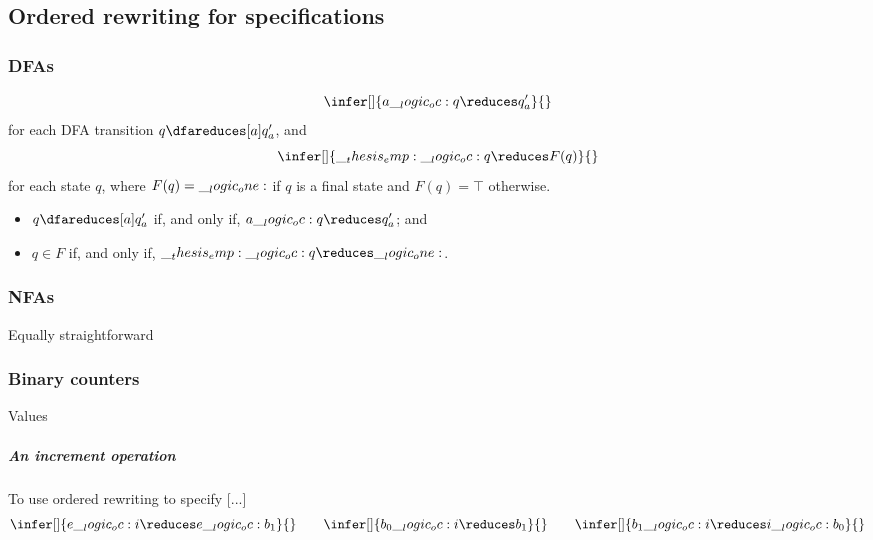 \chapter{}

\section{Ordered rewriting for specifications}

\subsection{\Aclp*{DFA}}

\begin{equation*}
  \infer[]{a \oc q \reduces q'_a}{}
\end{equation*}
for each \ac{DFA} transition $q \dfareduces[a] q'_a$, and 
\begin{equation*}
  \infer[]{\emp \oc q \reduces F(q)}{}
\end{equation*}
for each state $q$, where $F(q) = \__logic_one:$ if $q$ is a final state and $F(q) = \top$ otherwise.

\begin{itemize}
\item $q \dfareduces[a] q'_a$ if, and only if, $a \oc q \reduces q'_a$; and 
\item $q \in F$ if, and only if, $\emp \oc q \reduces \one$.
\end{itemize}

\subsection{\Aclp*{NFA}}

Equally straightforward

\subsection{Binary counters}

Values

\paragraph*{An increment operation}
To use ordered rewriting to specify [...]
\begin{equation*}
  \infer[]{e \oc i \reduces e \oc b_1}{}
  \qquad
  \infer[]{b_0 \oc i \reduces b_1}{}
  \qquad
  \infer[]{b_1 \oc i \reduces i \oc b_0}{}
\end{equation*}

